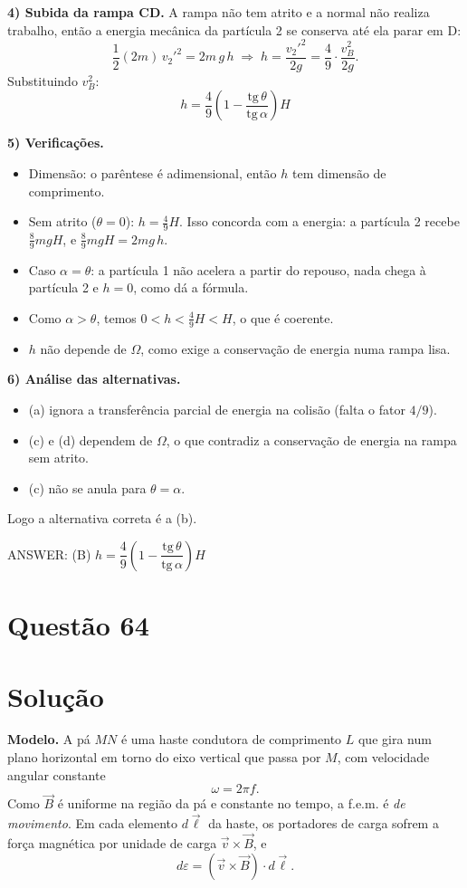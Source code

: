 \documentclass{article}%
\begin{document}
\textbf{4) Subida da rampa CD.} A rampa não tem atrito e a normal não realiza trabalho, então a energia mecânica da partícula 2 se conserva até ela parar em D:
\[
\frac12(2m)\,v_2'^2 = 2m\,g\,h \;\Longrightarrow\; h = \frac{v_2'^2}{2g} = \frac{4}{9}\cdot\frac{v_B^2}{2g}.
\]
Substituindo $v_B^2$:
\[
\boxed{\,h = \frac{4}{9}\left(1-\frac{\text{tg}\,\theta}{\text{tg}\,\alpha}\right)H\,}
\]

\textbf{5) Verificações.}
\begin{itemize}
\item Dimensão: o parêntese é adimensional, então $h$ tem dimensão de comprimento.
\item Sem atrito ($\theta = 0$): $h=\tfrac49 H$. Isso concorda com a energia: a partícula 2 recebe $\tfrac89 mgH$, e $\tfrac89 mgH = 2mg\,h$.
\item Caso $\alpha=\theta$: a partícula 1 não acelera a partir do repouso, nada chega à partícula 2 e $h=0$, como dá a fórmula.
\item Como $\alpha>\theta$, temos $0<h<\tfrac49 H<H$, o que é coerente.
\item $h$ não depende de $\Omega$, como exige a conservação de energia numa rampa lisa.
\end{itemize}

\textbf{6) Análise das alternativas.}
\begin{itemize}
\item (a) ignora a transferência parcial de energia na colisão (falta o fator $4/9$).
\item (c) e (d) dependem de $\Omega$, o que contradiz a conservação de energia na rampa sem atrito.
\item (c) não se anula para $\theta=\alpha$.
\end{itemize}
Logo a alternativa correta é a (b).

ANSWER: (B) $h=\dfrac{4}{9}\left(1-\dfrac{\text{tg}\,\theta}{\text{tg}\,\alpha}\right)H$
%
\newpage%
\section*{Questão 64}

\section*{Solução}

\textbf{Modelo.} A pá $MN$ é uma haste condutora de comprimento $L$ que gira num plano horizontal em torno do eixo vertical que passa por $M$, com velocidade angular constante
\[
\omega = 2\pi f .
\]
Como $\vec B$ é uniforme na região da pá e constante no tempo, a f.e.m. é \emph{de movimento}. Em cada elemento $d\vec\ell$ da haste, os portadores de carga sofrem a força magnética por unidade de carga $\vec v\times\vec B$, e
\[
d\varepsilon = (\vec v\times\vec B)\cdot d\vec\ell .
\]
\end{document}
